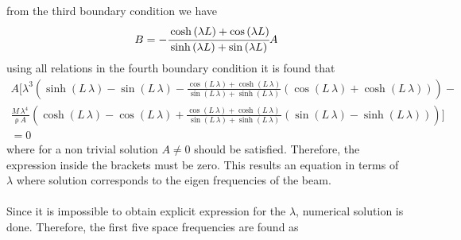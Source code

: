 \documentclass[]{report}
\begin{document}
from the third boundary condition we have
\begin{equation}
B=-\cfrac{\cosh\left(\lambda L\right)+\cos\left(\lambda L\right)}{\sinh\left(\lambda L\right)+\sin\left(\lambda L\right)}A
\label{eq:barel}
\end{equation}
using all relations in the fourth boundary condition it is found that
\begin{align*}
A\biggl[\lambda^3\left( \sinh\!\left(L\, \lambda\right)-\sin\!\left(L\, \lambda\right)  - \frac{{\cos\!\left(L\, \lambda\right) + \cosh\!\left(L\, \lambda\right)}}{\sin\!\left(L\, \lambda\right) + \sinh\!\left(L\, \lambda\right)}{\left(\cos\!\left(L\, \lambda\right) + \cosh\!\left(L\, \lambda\right)\right)}\right)-&
\\ 
\frac{M\, {\lambda}^4\,}{{ \mathrm{\rho}\, A}} \left(\cosh\!\left(L\, \lambda\right) - \cos\!\left(L\, \lambda\right) + \frac{\cos\!\left(L\, \lambda\right) + \cosh\!\left(L\, \lambda\right)\, }{\sin\!\left(L\, \lambda\right) + \sinh\!\left(L\, \lambda\right)}\left(\sin\!\left(L\, \lambda\right) - \sinh\!\left(L\, \lambda\right)\right)\right)\biggr]&\\= 0&
\end{align*}
where for a non trivial solution $A\neq 0$ should be satisfied. Therefore, the expression inside the brackets must be zero. This results an equation in terms of $\lambda$ where solution corresponds to the eigen frequencies of the beam. 
\\~\\
Since it is impossible to obtain explicit expression for the $\lambda$, numerical solution is done. Therefore, the first five space frequencies are found as
\end{document}
